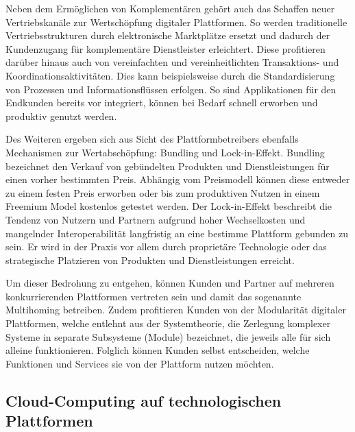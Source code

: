 Neben dem Ermöglichen von Komplementären gehört auch das Schaffen neuer Vertriebskanäle zur Wertschöpfung digitaler Plattformen. So werden traditionelle Vertriebsstrukturen durch elektronische Marktplätze ersetzt und dadurch der Kundenzugang für komplementäre Dienstleister erleichtert. Diese profitieren darüber hinaus auch von vereinfachten und vereinheitlichten Transaktions- und Koordinationsaktivitäten. Dies kann beispielsweise durch die Standardisierung von Prozessen und Informationsflüssen erfolgen. So sind Applikationen für den Endkunden bereits vor integriert, können bei Bedarf schnell erworben und produktiv genutzt werden.\autocite[Vgl.][S. 599f.]{HAHN2016}

Des Weiteren ergeben sich aus Sicht des Plattformbetreibers ebenfalls Mechanismen zur Wertabschöpfung: Bundling und Lock-in-Effekt. Bundling bezeichnet den Verkauf von gebündelten Produkten und Dienstleistungen für einen vorher bestimmten Preis. Abhängig vom Preismodell können diese entweder zu einem festen Preis erworben oder bis zum produktiven Nutzen in einem Freemium Model kostenlos getestet werden.\autocite[Vgl.][S. 178-185]{TEECE2010} Der Lock-in-Effekt beschreibt die Tendenz von Nutzern und Partnern aufgrund hoher Wechselkosten und mangelnder Interoperabilität langfristig an eine bestimme Plattform gebunden zu sein. \autocite[Vgl.][S. 22]{STEUR2022} Er wird in der Praxis vor allem durch proprietäre Technologie oder das strategische Platzieren von Produkten und Dienstleistungen erreicht. \autocite[Vgl.][S. 704]{BALLON2011}

Um dieser Bedrohung zu entgehen, können Kunden und Partner auf mehreren konkurrierenden Plattformen vertreten sein und damit das sogenannte Multihoming betreiben. \autocite[Vgl.][S. 461ff]{CENNAMO2018} Zudem profitieren Kunden von der Modularität digitaler Plattformen, welche entlehnt aus der Systemtheorie, die Zerlegung komplexer Systeme in separate Subsysteme (Module) bezeichnet, die jeweils alle für sich alleine funktionieren. \autocite[Vgl.][S. 2]{LECHNER2019} Folglich können Kunden selbst entscheiden, welche Funktionen und Services sie von der Plattform nutzen möchten.

\subsection{Cloud-Computing auf technologischen Plattformen}


